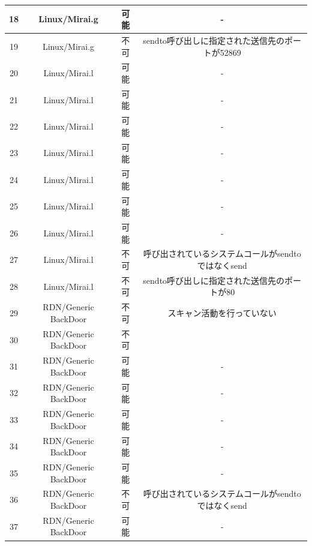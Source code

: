 \begin{small}
\begin{flushleft}
\begin{longtable}{|c|c|c|c|}
        18 & Linux/Mirai.g        & 可能    & -                             \\ \hline
        19 & Linux/Mirai.g        & 不可    & sendto呼び出しに指定された送信先のポートが52869 \\ \hline
        20 & Linux/Mirai.l        & 可能    & -                             \\ \hline
        21 & Linux/Mirai.l        & 可能    & -                             \\ \hline
        22 & Linux/Mirai.l        & 可能    & -                             \\ \hline
        23 & Linux/Mirai.l        & 可能    & -                             \\ \hline
        24 & Linux/Mirai.l        & 可能    & -                             \\ \hline
        25 & Linux/Mirai.l        & 可能    & -                             \\ \hline
        26 & Linux/Mirai.l       
         & 可能    & -                             \\ \hline
        27 & Linux/Mirai.l        & 不可    & 呼び出されているシステムコールがsendtoではなくsend       \\ \hline
        28 & Linux/Mirai.l        & 不可    & sendto呼び出しに指定された送信先のポートが80    \\ \hline
        29 & RDN/Generic BackDoor & 不可    & スキャン活動を行っていない                 \\ \hline
        30 & RDN/Generic BackDoor & 不可    &   \\ \hline
        31 & RDN/Generic BackDoor & 可能    & -                             \\ \hline
        32 & RDN/Generic BackDoor & 可能    & -                             \\ \hline
        33 & RDN/Generic BackDoor & 可能    & -                             \\ \hline
        34 & RDN/Generic BackDoor & 可能    & -                             \\ \hline
        35 & RDN/Generic BackDoor & 可能    & -                             \\ \hline
        36 & RDN/Generic BackDoor & 不可    & 呼び出されているシステムコールがsendtoではなくsend       \\ \hline
        37 & RDN/Generic BackDoor & 可能    & -                             \\ \hline

\end{longtable}
\end{flushleft}
\end{small}

